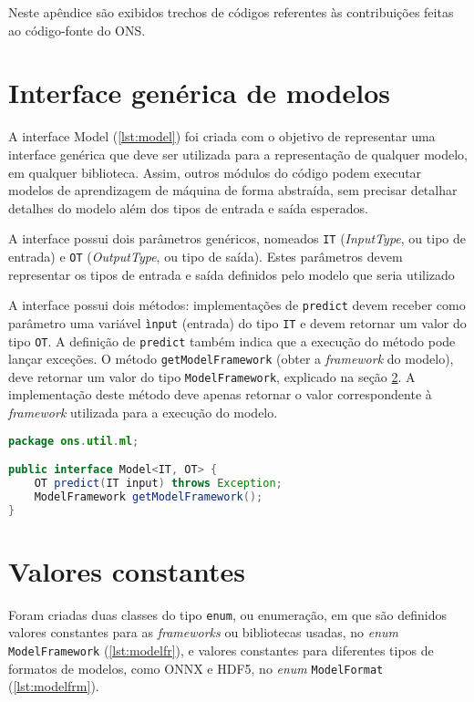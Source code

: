 Neste apêndice são exibidos trechos de códigos referentes às contribuições feitas ao código-fonte do \acrfull{ONS}.

\section{Interface genérica de modelos}
\label{appendix-ons-model}

A interface Model (\ref{lst:model}) foi criada com o objetivo de representar uma interface genérica que deve ser utilizada para a representação de qualquer modelo, em qualquer biblioteca. Assim, outros módulos do código podem executar modelos de aprendizagem de máquina de forma abstraída, sem precisar detalhar detalhes do modelo além dos tipos de entrada e saída esperados.

A interface possui dois parâmetros genéricos, nomeados \texttt{IT} (\textit{InputType}, ou tipo de entrada) e \texttt{OT} (\textit{OutputType}, ou tipo de saída). Estes parâmetros devem representar os tipos de entrada e saída definidos pelo modelo que seria utilizado

A interface possui dois métodos: implementações de \texttt{predict} devem receber como parâmetro uma variável \texttt{ìnput} (entrada) do tipo \texttt{IT} e devem retornar um valor do tipo \texttt{OT}. A definição de \texttt{predict} também indica que a execução do método pode lançar exceções. O método \texttt{getModelFramework} (obter a \textit{framework} do modelo), deve retornar um valor do tipo \texttt{ModelFramework}, explicado na seção \ref{appendix-ons-enums}. A implementação deste método deve apenas retornar o valor correspondente à \textit{framework} utilizada para a execução do modelo.

\begin{lstlisting}[language=Java, caption=Implementação da interface Model, label={lst:model}]
package ons.util.ml;

public interface Model<IT, OT> {
    OT predict(IT input) throws Exception;
    ModelFramework getModelFramework();
}
\end{lstlisting}

\section{Valores constantes}
\label{appendix-ons-enums}

Foram criadas duas classes do tipo \texttt{enum}, ou enumeração, em que são definidos valores constantes para as \textit{frameworks} ou bibliotecas usadas, no \textit{enum} \texttt{ModelFramework} (\ref{lst:modelfr}), e valores constantes para diferentes tipos de formatos de modelos, como ONNX e HDF5, no \textit{enum} \texttt{ModelFormat} (\ref{lst:modelfrm}).

